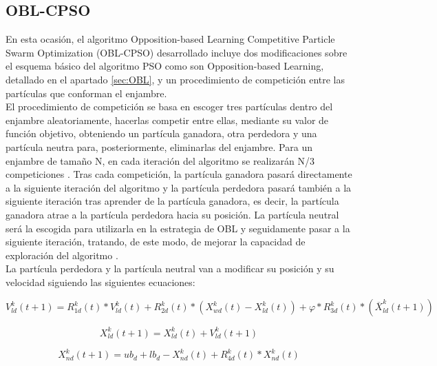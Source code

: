 \subsection{OBL-CPSO}
En esta ocasión, el algoritmo Opposition-based Learning Competitive Particle Swarm Optimization (OBL-CPSO) \cite{oblcpso} desarrollado incluye dos modificaciones sobre el esquema básico del algoritmo PSO como son Opposition-based Learning, detallado en el apartado \ref{sec:OBL}, y un procedimiento de competición entre las partículas que conforman el enjambre. \\

El procedimiento de competición se basa en escoger tres partículas dentro del enjambre aleatoriamente, hacerlas competir entre ellas, mediante su valor de función objetivo, obteniendo un partícula ganadora, otra perdedora y una partícula neutra para, posteriormente, eliminarlas del enjambre. Para un enjambre de tamaño N, en cada iteración del algoritmo se realizarán N/3 competiciones \cite{oblcpso}. Tras cada competición, la partícula ganadora pasará directamente a la siguiente iteración del algoritmo y la partícula perdedora pasará también a la siguiente iteración tras aprender de la partícula ganadora, es decir, la partícula ganadora atrae a la partícula perdedora hacia su posición. La partícula neutral será la escogida para utilizarla en la estrategia de OBL y seguidamente pasar a la siguiente iteración, tratando, de este modo, de mejorar la capacidad de exploración del algoritmo \cite{oblcpso}. \\

La partícula perdedora y la partícula neutral van a modificar su posición y su velocidad siguiendo las siguientes ecuaciones:

\begin{equation} \label{eq:7}
    V^{k}_{ld}(t+1) = R^{k}_{1d}(t) * V^{k}_{ld}(t) + R^{k}_{2d}(t) * (X^{k}_{wd}(t) - X^{k}_{ld}(t)) + \varphi * R^{k}_{3d}(t) * (\overline{X}^{k}_{ld}(t+1)) 
\end{equation}

\begin{equation} \label{eq:8}
     X^{k}_{ld}(t+1) = X^{k}_{ld}(t) + V^{k}_{ld}(t+1)
\end{equation}

\begin{equation} \label{eq:9}
     X^{k}_{nd}(t+1) = ub_{d} + lb_{d} - X^{k}_{nd}(t) + R^{k}_{4d}(t) * X^{k}_{nd}(t)
\end{equation}

